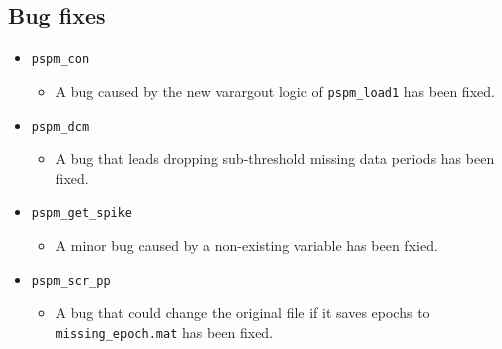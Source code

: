 \documentclass[english]{article}
\numberwithin{equation}{section}
\numberwithin{figure}{section}
\begin{document}
\subsection*{Bug fixes}
\begin{itemize}
\item \texttt{pspm\_con}
\begin{itemize}
\item A bug caused by the new varargout logic of \texttt{pspm\_load1} has
been fixed.
\end{itemize}
\item \texttt{pspm\_dcm}
\begin{itemize}
\item A bug that leads dropping sub-threshold missing data periods has been
fixed.
\end{itemize}
\item \texttt{pspm\_get\_spike}
\begin{itemize}
\item A minor bug caused by a non-existing variable has been fxied.
\end{itemize}
\item \texttt{pspm\_scr\_pp}
\begin{itemize}
\item A bug that could change the original file if it saves epochs to \texttt{missing\_epoch.mat}
has been fixed. 
\end{itemize}
\end{itemize}
\end{document}
